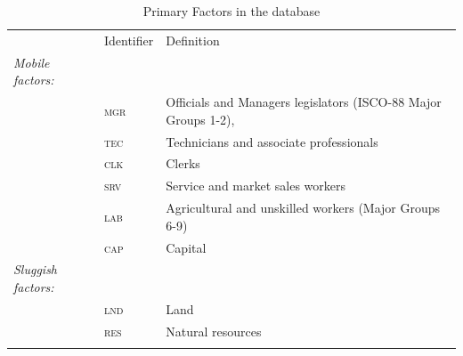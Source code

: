 \renewcommand{\arraystretch}{1}
\renewcommand{\tabcolsep}{1mm}
\begin{table}[ht!]
\caption{Primary Factors in the  database}
\label{factors}
\vspace{2ex}
\small
\begin{center}
\begin{tabular}{lll}
\toprule
&Identifier &Definition \\
\addlinespace
\midrule
\addlinespace
\emph{Mobile factors:}\\
&\textsc{mgr} & Officials and Managers legislators (ISCO-88 Major Groups 1-2), \\
&\textsc{tec} & Technicians and associate professionals\\
&\textsc{clk} & Clerks\\
&\textsc{srv} & Service and market sales workers\\
&\textsc{lab} & Agricultural and unskilled workers (Major Groups 6-9)\\
&\textsc{cap} & Capital    \\
\emph{Sluggish factors:}\\
&\textsc{lnd} & Land \\
&\textsc{res} & Natural resources \\
\addlinespace
\bottomrule
\end{tabular}
\end{center}
\end{table}
